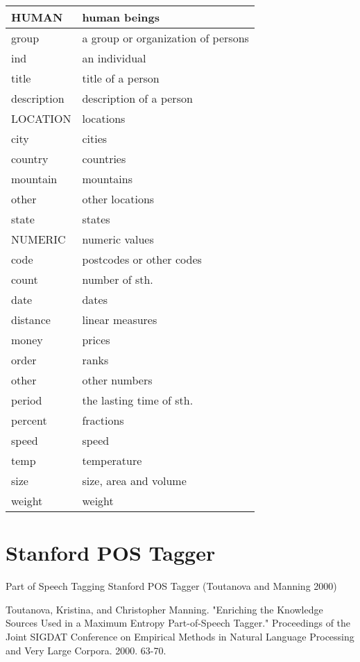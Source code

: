 \begin{center}
\begin{tabular}{| l | l |}
\end{tabular}
\begin{tabular}{| l | l |}
\hline
HUMAN & human beings\\ \hline 
  group & a group or organization of persons\\ \hline 
  ind & an individual\\ \hline 
  title & title of a person\\ \hline 
  description & description of a person\\ \hline 
LOCATION & locations\\ \hline 
  city & cities\\ \hline 
  country & countries\\ \hline 
  mountain & mountains\\ \hline 
  other & other locations\\ \hline 
  state & states\\ \hline 
NUMERIC & numeric values\\ \hline 
  code  & postcodes or other codes\\ \hline 
  count & number of sth.\\ \hline 
  date  & dates\\ \hline 
  distance &  linear measures\\ \hline 
  money & prices\\ \hline 
  order & ranks\\ \hline 
  other & other numbers\\ \hline 
  period  & the lasting time of sth.\\ \hline 
  percent & fractions\\ \hline 
  speed & speed\\ \hline 
  temp & temperature\\ \hline 
  size & size, area and volume\\ \hline 
  weight & weight\\ \hline 
\end{tabular}
\end{center}


\section{Stanford POS Tagger}

Part of Speech Tagging Stanford POS Tagger (Toutanova and Manning 
2000)

Toutanova, Kristina, and Christopher Manning. "Enriching the Knowledge 
Sources Used in a Maximum Entropy Part-of-Speech Tagger." Proceedings of 
the Joint SIGDAT Conference on Empirical Methods in Natural Language 
Processing and Very Large Corpora. 2000. 63-70.


